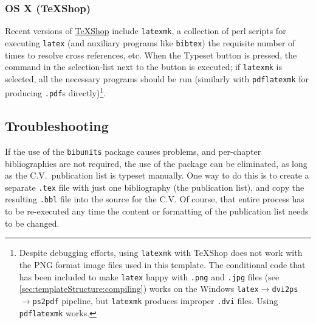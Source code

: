 \subsubsection{OS X (TeXShop)}
Recent versions of \href{http://www.uoregon.edu/~koch/texshop/}{TeXShop} include \texttt{latexmk}, a collection of perl scripts for executing \texttt{latex} (and auxiliary programs like \texttt{bibtex}) the requisite number of times to resolve cross references, etc.
When the Typeset button is pressed, the command in the selection-list next to the button is executed; if \texttt{latexmk} is selected, all the necessary programs should be run (similarly with \texttt{pdflatexmk} for producing \texttt{.pdf}s directly)\footnote{Despite debugging efforts, using \texttt{latexmk} with TeXShop does not work with the PNG format image files used in this template.
The conditional code that has been included to make \texttt{latex} happy with \texttt{.png} and \texttt{.jpg} files (see \autoref{sec:templateStructure:compiling}) works on the Windows \texttt{latex}$\rightarrow$\texttt{dvi2ps}$\rightarrow$\texttt{ps2pdf} pipeline, but \texttt{latexmk} produces improper \texttt{.dvi} files.
Using \texttt{pdflatexmk} works.}.

\subsection{Troubleshooting}
If the use of the \texttt{bibunits} package causes problems, and per-chapter bibliographies are not required, the use of the package can be eliminated, as long as the C.V.\ publication list is typeset manually.
One way to do this is to create a separate \texttt{.tex} file with just one bibliography (the publication list), and copy the resulting \texttt{.bbl} file into the source for the C.V.
Of course, that entire process has to be re-executed any time the content or formatting of the publication list needs to be changed.